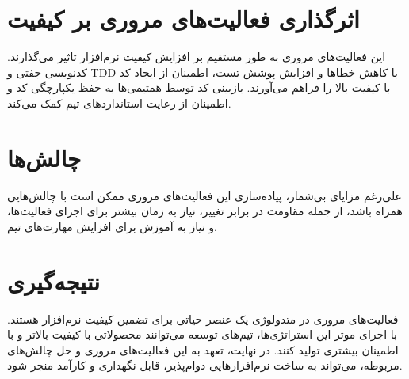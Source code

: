 \section{اثرگذاری فعالیت‌های مروری بر کیفیت}
این فعالیت‌های مروری به طور مستقیم بر افزایش کیفیت نرم‌افزار تاثیر می‌گذارند. کدنویسی جفتی و TDD با کاهش خطاها و افزایش پوشش تست، اطمینان از ایجاد کد با کیفیت بالا را فراهم می‌آورند. بازبینی کد توسط همتیمی‌ها به حفظ یکپارچگی کد و اطمینان از رعایت استانداردهای تیم کمک می‌کند.

\section{چالش‌ها}
علی‌رغم مزایای بی‌شمار، پیاده‌سازی این فعالیت‌های مروری ممکن است با چالش‌هایی همراه باشد، از جمله مقاومت در برابر تغییر، نیاز به زمان بیشتر برای اجرای فعالیت‌ها، و نیاز به آموزش برای افزایش مهارت‌های تیم.

\section{نتیجه‌گیری}
فعالیت‌های مروری در متدولوژی  یک عنصر حیاتی برای تضمین کیفیت نرم‌افزار هستند. با اجرای موثر این استراتژی‌ها، تیم‌های توسعه می‌توانند محصولاتی با کیفیت بالاتر و با اطمینان بیشتری تولید کنند. در نهایت، تعهد به این فعالیت‌های مروری و حل چالش‌های مربوطه، می‌تواند به ساخت نرم‌افزارهایی دوام‌پذیر، قابل نگهداری و کارآمد منجر شود.
